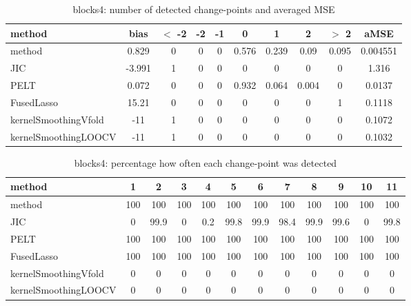 \begin{table}[ht]
\centering
\begin{tabular}{l|c|ccccccc|c}
  \hline
method & bias & $<$ -2 & -2 & -1 & 0 & 1 & 2 & $>$ 2 & aMSE \\ 
  \hline
method & 0.829 &     0 &     0 &     0 & 0.576 & 0.239 &  0.09 & 0.095 & 0.004551 \\ 
  JIC & -3.991 &     1 &     0 &     0 &     0 &     0 &     0 &     0 & 1.316 \\ 
  PELT & 0.072 &     0 &     0 &     0 & 0.932 & 0.064 & 0.004 &     0 & 0.0137 \\ 
  FusedLasso & 15.21 &     0 &     0 &     0 &     0 &     0 &     0 &     1 & 0.1118 \\ 
  kernelSmoothingVfold &   -11 &     1 &     0 &     0 &     0 &     0 &     0 &     0 & 0.1072 \\ 
  kernelSmoothingLOOCV &   -11 &     1 &     0 &     0 &     0 &     0 &     0 &     0 & 0.1032 \\ 
   \hline
\end{tabular}
\caption{blocks4: number of detected change-points and averaged MSE} 
\label{tab:blocks4Njumps}
\end{table}
\begin{table}[ht]
\centering
\begin{tabular}{l|ccccccccccc}
  \hline
method & 1 & 2 & 3 & 4 & 5 & 6 & 7 & 8 & 9 & 10 & 11 \\ 
  \hline
method &    100 &    100 &    100 &    100 &    100 &    100 &    100 &    100 &    100 &    100 &    100 \\ 
  JIC &      0 &   99.9 &      0 &    0.2 &   99.8 &   99.9 &   98.4 &   99.9 &   99.6 &      0 &   99.8 \\ 
  PELT &    100 &    100 &    100 &    100 &    100 &    100 &    100 &    100 &    100 &    100 &    100 \\ 
  FusedLasso &    100 &    100 &    100 &    100 &    100 &    100 &    100 &    100 &    100 &    100 &    100 \\ 
  kernelSmoothingVfold &      0 &      0 &      0 &      0 &      0 &      0 &      0 &      0 &      0 &      0 &      0 \\ 
  kernelSmoothingLOOCV &      0 &      0 &      0 &      0 &      0 &      0 &      0 &      0 &      0 &      0 &      0 \\ 
   \hline
\end{tabular}
\caption{blocks4: percentage how often each change-point was detected} 
\label{tab:blocks4Detections}
\end{table}

